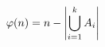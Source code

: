 \documentclass[preview]{standalone}
\begin{document}
\begin{align*}
\special{dvisvgm:raw <g id='unique000'>}\varphi(n) = n - \left|\bigcup_{i=1}^{k} A_i\right|\special{dvisvgm:raw </g>}
\end{align*}
\end{document}
